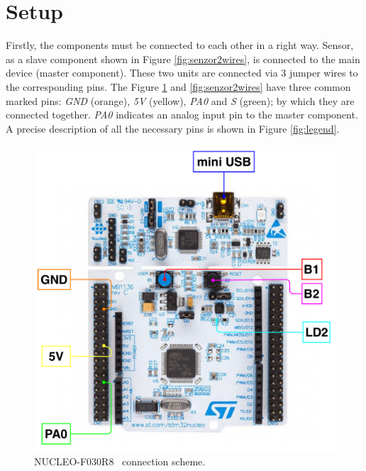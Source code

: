 \documentclass[11pt,a4paper]{article}
\begin{document}
\section{Setup}

Firstly, the components must be connected to each other in a right way. Sensor, as a slave component shown in Figure \ref{fig:senzor2wires}, is connected to the main device (master component). These two units are connected via 3 jumper wires to the corresponding pins. The Figure \ref{fig:device2wires} and \ref{fig:senzor2wires} have three common marked pins: \textit{GND} (orange), \textit{5V} (yellow), \textit{PA0} and \textit{S} (green); by which they are connected together. \textit{PA0} indicates an analog input pin to the master component. A precise description of all the necessary pins is shown in Figure \ref{fig:legend}.

\begin{figure}[H]
    \centering
    \includegraphics[scale=0.5]{img/device2-wires.pdf}
    \caption{NUCLEO-F030R8~\cite{IMG-DEVICE-2} connection scheme.}
    \label{fig:device2wires}
\end{figure}
\end{document}
